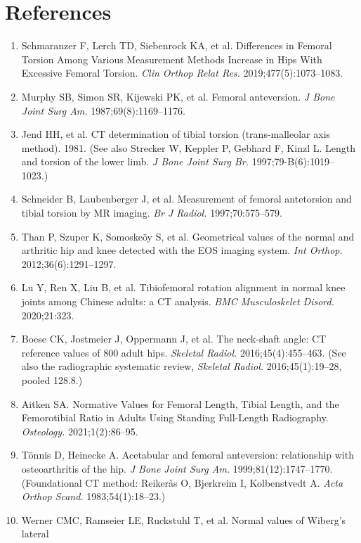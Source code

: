 \documentclass[10pt]{article}
\begin{document}
\section*{References}
\begin{enumerate}[leftmargin=2em,itemsep=2pt]
  \item Schmaranzer F, Lerch TD, Siebenrock KA, et al. Differences in Femoral Torsion
        Among Various Measurement Methods Increase in Hips With Excessive Femoral
        Torsion. \emph{Clin Orthop Relat Res.} 2019;477(5):1073--1083.
  \item Murphy SB, Simon SR, Kijewski PK, et al. Femoral anteversion. \emph{J Bone Joint
        Surg Am.} 1987;69(8):1169--1176.
  \item Jend HH, et al. CT determination of tibial torsion (trans-malleolar axis method).
        1981. (See also Strecker W, Keppler P, Gebhard F, Kinzl L. Length and torsion of
        the lower limb. \emph{J Bone Joint Surg Br.} 1997;79-B(6):1019--1023.)
  \item Schneider B, Laubenberger J, et al. Measurement of femoral antetorsion and tibial
        torsion by MR imaging. \emph{Br J Radiol.} 1997;70:575--579.
  \item Than P, Szuper K, Somoskeöy S, et al. Geometrical values of the normal and
        arthritic hip and knee detected with the EOS imaging system. \emph{Int Orthop.}
        2012;36(6):1291--1297.
  \item Lu Y, Ren X, Liu B, et al. Tibiofemoral rotation alignment in normal knee joints
        among Chinese adults: a CT analysis. \emph{BMC Musculoskelet Disord.} 2020;21:323.
  \item Boese CK, Jostmeier J, Oppermann J, et al. The neck-shaft angle: CT reference
        values of 800 adult hips. \emph{Skeletal Radiol.} 2016;45(4):455--463. (See also
        the radiographic systematic review, \emph{Skeletal Radiol.} 2016;45(1):19--28,
        pooled 128.8\textdegree{}.)
  \item Aitken SA. Normative Values for Femoral Length, Tibial Length, and the
        Femorotibial Ratio in Adults Using Standing Full-Length Radiography.
        \emph{Osteology.} 2021;1(2):86--95.
  \item Tönnis D, Heinecke A. Acetabular and femoral anteversion: relationship with
        osteoarthritis of the hip. \emph{J Bone Joint Surg Am.} 1999;81(12):1747--1770.
        (Foundational CT method: Reikerås O, Bjerkreim I, Kolbenstvedt A. \emph{Acta Orthop
        Scand.} 1983;54(1):18--23.)
  \item Werner CMC, Ramseier LE, Ruckstuhl T, et al. Normal values of Wiberg's lateral

\end{enumerate}
\end{document}
